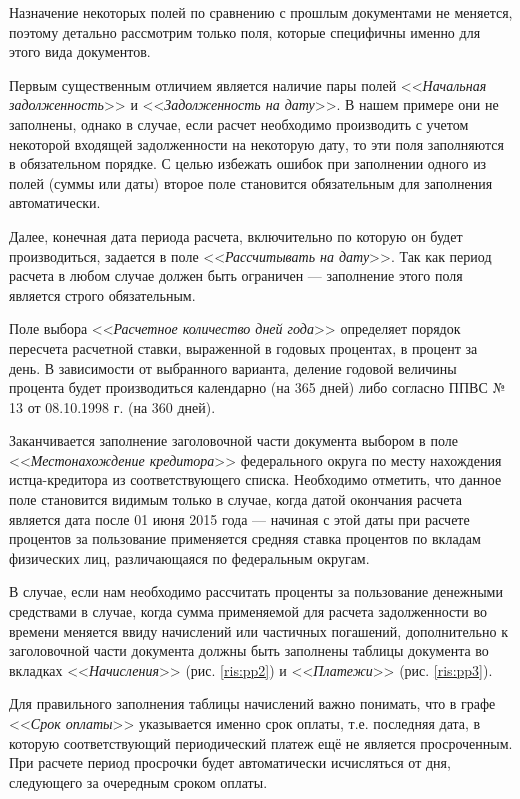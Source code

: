 \documentclass[a4paper,12pt,draft]{article}
\begin{document}
Назначение некоторых полей по сравнению с прошлым документами не меняется, поэтому детально рассмотрим только поля, которые специфичны именно для этого вида документов.

Первым существенным отличием является наличие пары полей <<{\it Начальная задолженность}>> и <<{\it Задолженность на дату}>>. В нашем примере они не заполнены, однако в случае, если расчет необходимо производить с учетом некоторой входящей задолженности на некоторую дату, то эти поля заполняются в обязательном порядке. С целью избежать ошибок при заполнении одного из полей (суммы или даты) второе поле становится обязательным для заполнения автоматически.

Далее, конечная дата периода расчета, включительно по которую он будет производиться, задается в поле <<{\it Рассчитывать на дату}>>. Так как период расчета в любом случае должен быть ограничен --- заполнение этого поля является строго обязательным.

Поле выбора <<{\it Расчетное количество дней года}>> определяет порядок пересчета расчетной ставки, выраженной в годовых процентах, в процент за день. В зависимости от выбранного варианта, деление годовой величины процента будет производиться календарно (на 365 дней) либо согласно ППВС № 13 от 08.10.1998 г. (на 360 дней).

Заканчивается заполнение заголовочной части документа выбором  в поле <<{\it Местонахождение кредитора}>> федерального округа по месту нахождения истца-кредитора из соответствующего списка. Необходимо отметить, что данное поле становится видимым только в случае, когда датой окончания расчета является дата после 01 июня 2015 года --- начиная с этой даты при расчете процентов за пользование применяется средняя ставка процентов по вкладам физических лиц, различающаяся по федеральным округам.

В случае, если нам необходимо рассчитать проценты за пользование денежными средствами в случае, когда сумма применяемой для расчета задолженности во времени меняется ввиду начислений или частичных погашений, дополнительно к заголовочной части документа должны быть заполнены таблицы документа во вкладках <<{\it Начисления}>> (рис. \ref{ris:pp2}) и <<{\it Платежи}>> (рис. \ref{ris:pp3}).

Для правильного заполнения таблицы начислений важно понимать, что в графе <<{\it Срок оплаты}>> указывается именно срок оплаты, т.е. последняя дата, в которую соответствующий периодический платеж ещё не является просроченным. При расчете период просрочки будет автоматически исчисляться от дня, следующего за очередным сроком оплаты.
\end{document}
